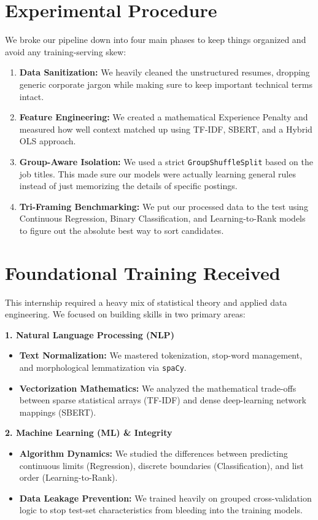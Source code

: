 \documentclass[12pt,a4paper,oneside]{report}
\begin{document}
\section{Experimental Procedure}
We broke our pipeline down into four main phases to keep things organized and avoid any training-serving skew:
\begin{enumerate}
    \item \textbf{Data Sanitization:} We heavily cleaned the unstructured resumes, dropping generic corporate jargon while making sure to keep important technical terms intact.
    \item \textbf{Feature Engineering:} We created a mathematical Experience Penalty and measured how well context matched up using TF-IDF, SBERT, and a Hybrid OLS approach.
    \item \textbf{Group-Aware Isolation:} We used a strict \texttt{GroupShuffleSplit} based on the job titles. This made sure our models were actually learning general rules instead of just memorizing the details of specific postings.
    \item \textbf{Tri-Framing Benchmarking:} We put our processed data to the test using Continuous Regression, Binary Classification, and Learning-to-Rank models to figure out the absolute best way to sort candidates.
\end{enumerate}

\section{Foundational Training Received}
This internship required a heavy mix of statistical theory and applied data engineering. We focused on building skills in two primary areas:

\vspace{0.3cm}
\noindent \textbf{1. Natural Language Processing (NLP)}
\begin{itemize}
    \item \textbf{Text Normalization:} We mastered tokenization, stop-word management, and morphological lemmatization via \texttt{spaCy}.
    \item \textbf{Vectorization Mathematics:} We analyzed the mathematical trade-offs between sparse statistical arrays (TF-IDF) and dense deep-learning network mappings (SBERT).
\end{itemize}

\noindent \textbf{2. Machine Learning (ML) \& Integrity}
\begin{itemize}
    \item \textbf{Algorithm Dynamics:} We studied the differences between predicting continuous limits (Regression), discrete boundaries (Classification), and list order (Learning-to-Rank).
    \item \textbf{Data Leakage Prevention:} We trained heavily on grouped cross-validation logic to stop test-set characteristics from bleeding into the training models.
\end{itemize}
\end{document}
